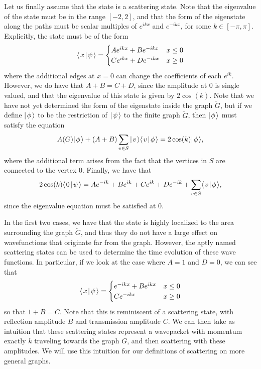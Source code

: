 \documentclass[../thesis-main/thesis-main]{subfiles}
\begin{document}
Let us finally assume that the state is a scattering state.  Note that the eigenvalue of the state must be in the range $[-2,2]$, and that the form of the eigenstate along the paths must be scalar multiples of $e^{ikx}$ and $e^{-ikx}$, for some $k\in [-\pi, \pi]$.  Explicitly, the state must be of the form
\begin{align}
  \langle\mspace{2mu} x \mspace{2mu} | \mspace{2mu} \psi\mspace{2mu} \rangle = \begin{cases} Ae^{i k x} + B e^{-i k x} & x \leq 0\\
   C e^{i k x} + D e^{-i k x} & x\geq 0\end{cases}
\end{align}
where the additional edges at $x=0$ can change the coefficients of each $e^{ik}$.  However, we do have that $A + B=C +D$, since the amplitude at $0$ is single valued, and that the eigenvalue of this state is given by $2\cos(k)$.  Note that we have not yet determined the form of the eigenstate inside the graph $\widetilde{G}$, but if we define $|\mspace{2mu} \phi \mspace{2mu} \rangle$ to be the restriction of $|\mspace{2mu} \psi \mspace{2mu} \rangle$ to the finite graph $\widetilde{G}$, then $|\mspace{2mu} \phi \mspace{2mu} \rangle$ must satisfy the equation
\begin{equation}
  A(G) |\mspace{2mu} \phi \mspace{2mu} \rangle + (A+ B)\sum_{v\in S} |\mspace{2mu} v \mspace{2mu} \rangle\langle\mspace{2mu} v \mspace{2mu} | \mspace{2mu} \phi\mspace{2mu} \rangle = 2\cos(k) |\mspace{2mu} \phi \mspace{2mu} \rangle,
\end{equation}
where the additional term arises from the fact that the vertices in $S$ are connected to the vertex $0$.  Finally, we have that
\begin{equation}
  2 \cos(k)\langle\mspace{2mu} 0 \mspace{2mu} | \mspace{2mu} \psi\mspace{2mu} \rangle = Ae^{-ik} + B e^{ik} + C e^{i k} + D e^{-ik} + \sum_{v\in S} \langle\mspace{2mu} v \mspace{2mu} | \mspace{2mu} \phi\mspace{2mu} \rangle,
\end{equation}
since the eigenvalue equation must be satisfied at $0$.

In the first two cases, we have that the state is highly localized to the area surrounding the graph $\widetilde{G}$, and thus they do not have a large effect on wavefunctions that originate far from the graph.  However, the aptly named scattering states can be used to determine the time evolution of these wave functions.  In particular, if we look at the case where $A = 1$ and $D = 0$,  we can see that
\begin{align}
  \langle\mspace{2mu} x \mspace{2mu} | \mspace{2mu} \psi\mspace{2mu} \rangle = \begin{cases} e^{-ikx} + B e^{i kx} & x\leq 0\\
  C e^{-ikx} & x \geq 0\end{cases}
\end{align}
so that $1+ B  =C$.  Note that this is reminiscent of a scattering state, with reflection amplitude $B$ and transmission amplitude $C$.  We can then take as intuition that these scattering states represent a wavepacket with momentum exactly $k$ traveling towards the graph $G$, and then scattering with these amplitudes.  We will use this intuition for our definitions of scattering on more general graphs. 
 
\end{document}
